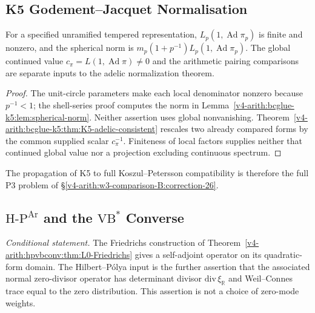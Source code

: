 \subsection{K5 Godement--Jacquet Normalisation}
\label{v4-arith:w3-comparison-B:correction-35}

\begin{proposition}
For a specified unramified tempered representation,
\(L_p(1,\operatorname{Ad}\pi_p)\) is finite and nonzero, and the
spherical norm is \(m_p(1+p^{-1})L_p(1,\operatorname{Ad}\pi_p)\).
The global continued value \(c_\pi=L(1,\operatorname{Ad}\pi)\ne0\)
and the arithmetic pairing comparisons are separate inputs to the
adelic normalization theorem.
\end{proposition}
\begin{proof}
The unit-circle parameters make each local denominator nonzero
because \(p^{-1}<1\); the shell-series proof computes the norm in
Lemma~\ref{v4-arith:bcglue-k5:lem:spherical-norm}. Neither assertion
uses global nonvanishing. Theorem~\ref{v4-arith:bcglue-k5:thm:K5-adelic-consistent}
rescales two already compared forms by the common supplied scalar
\(c_\pi^{-1}\). Finiteness of local factors supplies neither that
continued global value nor a projection excluding continuous spectrum.
\end{proof}

\begin{remark}
The propagation of K5 to full Koszul--Petersson compatibility is
therefore the full P3 problem of
\S\ref{v4-arith:w3-comparison-B:correction-26}.
\end{remark}

\subsection{\(\mathrm{H}\text{-}\mathrm{P}^{\mathrm{Ar}}\) and the \(\mathrm{VB}^{*}\) Converse}
\label{v4-arith:w3-comparison-B:correction-36}

\begin{proposition}
\emph{Conditional statement.} The Friedrichs construction of
Theorem~\ref{v4-arith:hpvbconv:thm:L0-Friedrichs} gives a self-adjoint
operator on its quadratic-form domain.  The Hilbert--P\'olya input is
the further assertion that the associated normal zero-divisor operator has
determinant divisor \(\mathrm{div}\,\xi_{\mathbb R}\) and
Weil--Connes trace equal to the zero distribution.  This assertion is
not a choice of zero-mode weights.
\end{proposition}

